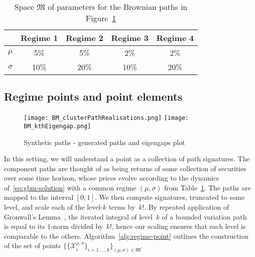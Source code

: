 \documentclass{amsart}[11pt]
\numberwithin{equation}{section}
\theoremstyle{definition}
\newcommand{\Xx}{\mathcal{X}}
\newcommand{\Mf}{\mathfrak{M}}
\begin{document}
\begin{table}[ht]
    \centering
\begin{tabular}{|c|cccc|}
\hline
 & Regime 1 & Regime 2 & Regime 3 & Regime 4\\
\hline
    $\mu$ & 5\% & 5\% & 2\% & 2\% \\
    $\sigma$ & 10\% & 20\% & 10\% & 20\% \\
\hline
\end{tabular}
\vspace{0.1cm}
    \caption{Space $\Mf$ of parameters for the Brownian paths in Figure~\ref{fig:synthetic-paths-eigengaps}}
    \label{tab:brownian-paths-parameters}
\end{table}
\subsection{Regime points and point elements}

\begin{figure}[b]
    \centering
        \texttt{[image: BM\_clusterPathRealisations.png]}
        \texttt{[image: BM\_kthEigengap.png]}
    \caption{Synthetic paths - generated paths and eigengaps plot}
    \label{fig:synthetic-paths-eigengaps}
\end{figure}

In this setting, we will understand a point as a collection of path signatures.
The component paths are thought of as being returns of some collection of securities over some time horizon, whose prices evolve according to the dynamics of~\eqref{eq:gbm-solution} with a common regime $(\mu, \sigma)$ from Table~\ref{tab:brownian-paths-parameters}.
The paths are mapped to the interval $[0,1]$. We then compute signatures, truncated to some level, and scale each of the level-$k$ terms by~$k!$.
By repeated application
of Gronwall's Lemma~\cite[Lemma 3.2]{FrizVictoir},
the iterated integral of level~$k$ of a bounded variation path 
is equal to its $1$-norm divided by~$k!$,
hence our scaling ensures that each level is comparable to the others.
Algorithm~\ref{alg:regime-point} outlines the construction of the set of points
$\{\{\Xx^{\mu, \sigma}_i\}_{i=1,\ldots, k}\}_{(\mu,\sigma) \in \Mf}$.
\end{document}
